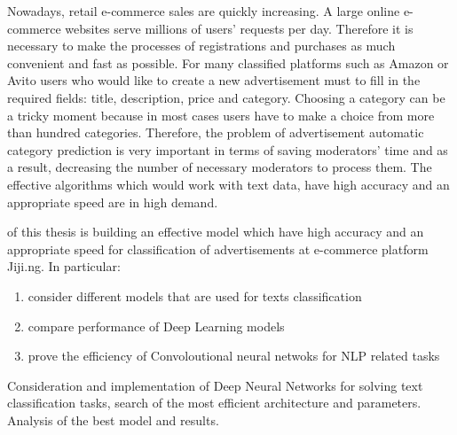 {\actuality}

Nowadays, retail e-commerce sales are quickly increasing. A large online e-commerce
websites serve millions of users’ requests per day. Therefore it is necessary to make the processes of registrations and purchases as much convenient and fast as possible. For many classified platforms such as Amazon or Avito users who would like to create a new advertisement must to fill in the required fields: title, description, price and category. Choosing a category can be a tricky moment because in most cases users have to make a choice from more than hundred categories. Therefore, the problem  of advertisement automatic category prediction is very important in terms of saving moderators' time and as a result, decreasing the number of necessary moderators to process them. The effective algorithms which would work with text data, have high accuracy and an appropriate speed are in high demand.

{\aim} of this thesis is building an effective model which have high accuracy and an appropriate speed for classification of advertisements at e-commerce platform Jiji.ng. 
In particular:
\begin{enumerate}
	\item consider different models that are used for texts classification 
	\item compare performance of Deep Learning models 
	\item prove the efficiency of Convoloutional neural netwoks for NLP related tasks 
\end{enumerate}


{\novelty}
Consideration and implementation of Deep Neural Networks for solving text classification tasks, search of the most efficient architecture and parameters. Analysis of the best model and results.

%
%
%
%
%
%

